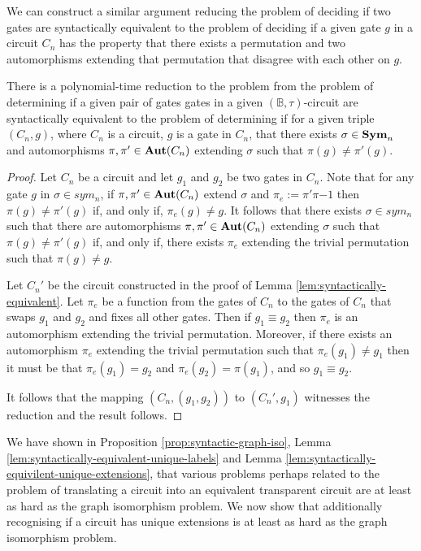 \documentclass[../paper.tex]{subfiles}
\begin{document}
We can construct a similar argument reducing the problem of deciding if two
gates are syntactically equivalent to the problem of deciding if a given gate
$g$ in a circuit $C_n$ has the property that there exists a permutation and two
automorphisms extending that permutation that disagree with each other on $g$.

\begin{lem}
  There is a polynomial-time reduction to the problem from the problem of
  determining if a given pair of gates gates in a given $(\mathbb{B},
  \tau)$-circuit are syntactically equivalent to the problem of determining if
  for a given triple $(C_n, g)$, where $C_n$ is a circuit, $g$ is a gate in
  $C_n$, that there exists $\sigma \in \text{\textbf{Sym}}_n$ and automorphisms $\pi, \pi' \in
  \text{\textbf{Aut}}(C_n)$ extending $\sigma$ such that $\pi (g) \neq \pi' (g)$.
  \label{lem:syntactically-equivilent-unique-extensions}
\end{lem}
\begin{proof}
  Let $C_n$ be a circuit and let $g_1$ and $g_2$ be two gates in $C_n$. Note
  that for any gate $g$ in $\sigma \in sym_n$, if $\pi, \pi' \in \text{\textbf{Aut}}(C_n)$
  extend $\sigma$ and $\pi_e := \pi'\pi{-1}$ then $\pi(g) \neq \pi'(g)$ if, and
  only if, $\pi_e (g) \neq g$. It follows that there exists $\sigma \in sym_n$
  such that there are automorphisms $\pi, \pi' \in \text{\textbf{Aut}}(C_n)$ extending $\sigma$
  such that $\pi (g) \neq \pi'(g)$ if, and only if, there exists $\pi_e$
  extending the trivial permutation such that $\pi (g) \neq g$.

  Let $C_n'$ be the circuit constructed in the proof of Lemma
  \ref{lem:syntactically-equivalent}. Let $\pi_e$ be a function from the gates
  of $C_n$ to the gates of $C_n$ that swaps $g_1$ and $g_2$ and fixes all other
  gates. Then if $g_1 \equiv g_2$ then $\pi_e$ is an automorphism extending the
  trivial permutation. Moreover, if there exists an automorphism $\pi_e$
  extending the trivial permutation such that $\pi_e(g_1) \neq g_1$ then it must
  be that $\pi_e (g_1) = g_2$ and $\pi_e(g_2) = \pi(g_1)$, and so $g_1 \equiv
  g_2$.

  It follows that the mapping $(C_n, (g_1, g_2))$ to $(C_n', g_1)$ witnesses the
  reduction and the result follows.
\end{proof}

We have shown in Proposition \ref{prop:syntactic-graph-iso}, Lemma
\ref{lem:syntactically-equivalent-unique-labels} and Lemma
\ref{lem:syntactically-equivilent-unique-extensions}, that various problems
perhaps related to the problem of translating a circuit into an equivalent
transparent circuit are at least as hard as the graph isomorphism problem. We
now show that additionally recognising if a circuit has unique extensions is at
least as hard as the graph isomorphism problem.
\end{document}
